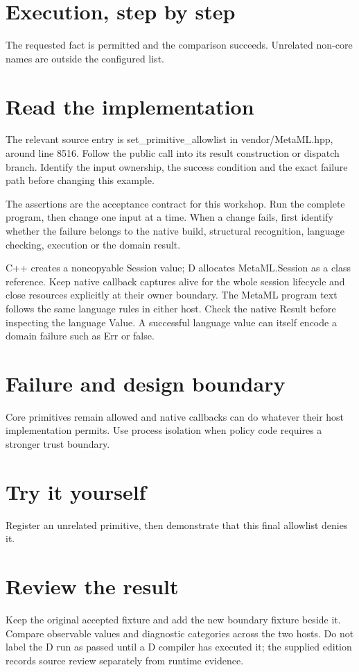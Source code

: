 \section*{Execution, step by step}
The requested fact is permitted and the comparison succeeds. Unrelated non-core names are outside the configured list.

\section*{Read the implementation}
The relevant source entry is set\_primitive\_allowlist in vendor/MetaML.hpp, around line 8516. Follow the public call into its result construction or dispatch branch. Identify the input ownership, the success condition and the exact failure path before changing this example.

The assertions are the acceptance contract for this workshop. Run the complete program, then change one input at a time. When a change fails, first identify whether the failure belongs to the native build, structural recognition, language checking, execution or the domain result.

\clearpage
{}
C++ creates a noncopyable Session value; D allocates MetaML.Session as a class reference. Keep native callback captures alive for the whole session lifecycle and close resources explicitly at their owner boundary. The MetaML program text follows the same language rules in either host. Check the native Result before inspecting the language Value. A successful language value can itself encode a domain failure such as Err or false.


\section*{Failure and design boundary}
Core primitives remain allowed and native callbacks can do whatever their host implementation permits. Use process isolation when policy code requires a stronger trust boundary.

\section*{Try it yourself}
Register an unrelated primitive, then demonstrate that this final allowlist denies it.

\section*{Review the result}
Keep the original accepted fixture and add the new boundary fixture beside it. Compare observable values and diagnostic categories across the two hosts. Do not label the D run as passed until a D compiler has executed it; the supplied edition records source review separately from runtime evidence.

